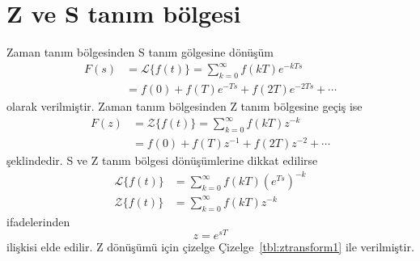 \chapter{Z ve S tanım bölgesi}
Zaman tanım bölgesinden S tanım gölgesine dönüşüm
\begin{equation}
\begin{split}
    F(s)&=\mathcal{L}\{f(t)\}=\sum_{k=0}^{\infty}f(kT)e^{-kTs}\\
    &=f(0)+f(T)e^{-Ts}+f(2T)e^{-2Ts}+\cdots
\end{split}
\end{equation}
olarak verilmiştir. Zaman tanım bölgesinden Z tanım bölgesine geçiş ise
\begin{equation}
    \begin{split}
        F(z)&=\mathcal{Z}\{f(t)\}=\sum_{k=0}^{\infty}f(kT)z^{-k}\\
        &=f(0)+f(T)z^{-1}+f(2T)z^{-2}+\cdots
    \end{split}
\end{equation}
şeklindedir. S ve Z tanım bölgesi dönüşümlerine dikkat edilirse
\begin{equation}
    \begin{split}
        \mathcal{L}\{f(t)\}&=\sum_{k=0}^{\infty}f(kT)(e^{Ts})^{-k}\\
        \mathcal{Z}\{f(t)\}&=\sum_{k=0}^{\infty}f(kT)z^{-k}
\end{split}
\end{equation}
ifadelerinden
\begin{equation}
    z=e^{sT}
\end{equation}
ilişkisi elde edilir.
Z dönüşümü için çizelge Çizelge~\ref{tbl:ztransform1} ile verilmiştir.

